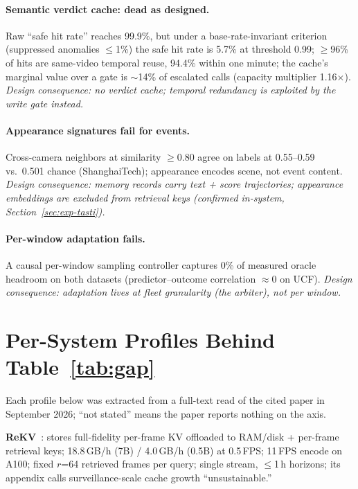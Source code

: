 \paragraph{Semantic verdict cache: dead as designed.} Raw ``safe hit rate'' reaches 99.9\%, but under a base-rate-invariant criterion (suppressed anomalies $\le$1\%) the safe hit rate is 5.7\% at threshold 0.99; $\ge$96\% of hits are same-video temporal reuse, 94.4\% within one minute; the cache's marginal value over a gate is $\sim$14\% of escalated calls (capacity multiplier 1.16$\times$). \emph{Design consequence: no verdict cache; temporal redundancy is exploited by the write gate instead.}

\paragraph{Appearance signatures fail for events.} Cross-camera neighbors at similarity $\ge$0.80 agree on labels at 0.55--0.59 vs.\ 0.501 chance (ShanghaiTech); appearance encodes scene, not event content. \emph{Design consequence: memory records carry text + score trajectories; appearance embeddings are excluded from retrieval keys (confirmed in-system, Section~\ref{sec:exp-tasti}).}

\paragraph{Per-window adaptation fails.} A causal per-window sampling controller captures 0\% of measured oracle headroom on both datasets (predictor--outcome correlation $\approx$0 on UCF). \emph{Design consequence: adaptation lives at fleet granularity (the arbiter), not per window.}

\section{Per-System Profiles Behind Table~\ref{tab:gap}}
\label{app:profiles}

Each profile below was extracted from a full-text read of the cited paper in September 2026; ``not stated'' means the paper reports nothing on the axis.

\textbf{ReKV}~\cite{rekv}: stores full-fidelity per-frame KV offloaded to RAM/disk + per-frame retrieval keys; 18.8\,GB/h (7B) / 4.0\,GB/h (0.5B) at 0.5\,FPS; 11\,FPS encode on A100; fixed $r$=64 retrieved frames per query; single stream, $\le$1\,h horizons; its appendix calls surveillance-scale cache growth ``unsustainable.''


